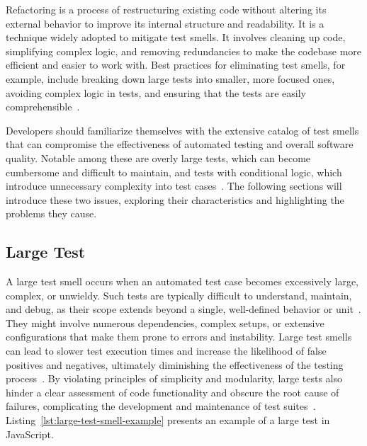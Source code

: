 \documentclass[
	msc, %
	english %
]{../ppgccufmg}
\begin{document}
    Refactoring is a process of restructuring existing code without altering its external behavior to improve its internal structure and readability. It is a technique widely adopted to mitigate test smells. It involves cleaning up code, simplifying complex logic, and removing redundancies to make the codebase more efficient and easier to work with. Best practices for eliminating test smells, for example, include breaking down large tests into smaller, more focused ones, avoiding complex logic in tests, and ensuring that the tests are easily comprehensible~\cite{Fowler2018}.

    Developers should familiarize themselves with the extensive catalog of test smells that can compromise the effectiveness of automated testing and overall software quality. Notable among these are overly large tests, which can become cumbersome and difficult to maintain, and tests with conditional logic, which introduce unnecessary complexity into test cases~\cite{beck2003}. The following sections will introduce these two issues, exploring their characteristics and highlighting the problems they cause.
    
    \subsection{Large Test}\label{sec:ch2-test-smells-large-test}

    A large test smell occurs when an automated test case becomes excessively large, complex, or unwieldy. Such tests are typically difficult to understand, maintain, and debug, as their scope extends beyond a single, well-defined behavior or unit~\cite{Osherove2009}. They might involve numerous dependencies, complex setups, or extensive configurations that make them prone to errors and instability. Large test smells can lead to slower test execution times and increase the likelihood of false positives and negatives, ultimately diminishing the effectiveness of the testing process~\cite{Meszaros2007}. By violating principles of simplicity and modularity, large tests also hinder a clear assessment of code functionality and obscure the root cause of failures, complicating the development and maintenance of test suites~\cite{Fontana2015}. Listing~\ref{lst:large-test-smell-example} presents an example of a large test in JavaScript.\\
\end{document}
